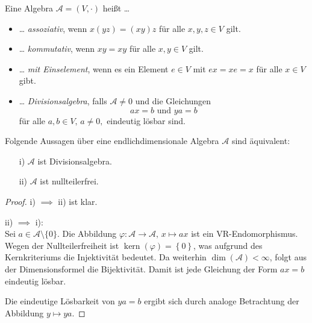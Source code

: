 \documentclass[aspectratio=169]{beamer}
\DeclareMathOperator{\kernel}{kern}
\begin{document}
    \begin{frame}
        \begin{definition}
            Eine Algebra \(\mathcal{A} = (V, \cdot)\) heißt \dots
            \begin{itemize}
                \item
                    \dots{} \textit{assoziativ}, wenn \(x(yz) = (xy)z\) für alle \(x, y, z \in V\) gilt.
                \item
                    \dots{} \textit{kommutativ}, wenn \(xy = xy\) für alle \(x, y \in V\) gilt.
                \item
                    \dots{} \textit{mit Einselement}, wenn es ein Element \(e \in V\) mit \(ex = xe = x\) für alle \(x \in V\) gibt.

                \item
                    \dots{} \textit{Divisionsalgebra}, falls \(\mathcal{A} \neq 0\) und die Gleichungen
                    \[
                        ax = b \text{ und } ya = b
                    \]
                    für alle \(a, b \in V, \, a \neq 0,\) eindeutig lösbar sind.
            \end{itemize}
        \end{definition}
    \end{frame}

    \begin{frame}
        \begin{lemma}
            Folgende Aussagen über eine endlichdimensionale Algebra \(\mathcal{A}\) sind äquivalent:
            \begin{itemize}
                \item[i)]
                    \(\mathcal{A}\) ist Divisionsalgebra.

                \item[ii)]
                    \(\mathcal{A}\) ist nullteilerfrei.
            \end{itemize}
        \end{lemma}
    \end{frame}

    \begin{frame}
        \begin{proof}
            i) \(\implies\) ii) ist klar.

            ii) \(\implies\) i): \\
            Sei \(a \in \mathcal{A} \setminus \{0\}\).
            Die Abbildung \(\varphi \colon \mathcal{A} \to \mathcal{A},\, x \mapsto ax\) ist ein VR-Endomorphismus.
            Wegen der Nullteilerfreiheit ist \(\kernel(\varphi) = \left\{ 0 \right\}\), was aufgrund des Kernkriteriums die Injektivität bedeutet.
            Da weiterhin \(\dim(\mathcal{A}) < \infty\), folgt aus der Dimensionsformel die Bijektivität.
            Damit ist jede Gleichung der Form \(ax = b\) eindeutig lösbar.

            Die eindeutige Lösbarkeit von \(ya = b\) ergibt sich durch analoge Betrachtung der Abbildung \(y \mapsto ya\).
        \end{proof}
    \end{frame}
\end{document}
